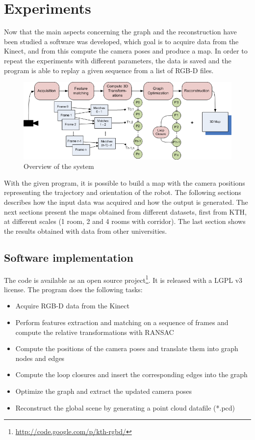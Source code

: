 \chapter{Experiments}
\label{chap:experiments}

Now that the main aspects concerning the graph and the reconstruction have been studied a software was developed, which goal is to acquire data from the Kinect, and from this compute the camera poses and produce a map. In order to repeat the experiments with different parameters, the data is saved and the program is able to replay a given sequence from a list of RGB-D files.

\begin{figure}[h!]
\begin{center}
\includegraphics[width=1.0\textwidth]{figures/overview}
\caption{Overview of the system}
\end{center}
\end{figure}

With the given program, it is possible to build a map with the camera positions representing the trajectory and orientation of the robot. The following sections describes how the input data was acquired and how the output is generated. The next sections present the maps obtained from different datasets, first from KTH, at different scales (1 room, 2 and 4 rooms with corridor). The last section shows the results obtained with data from other universities. 

\section{Software implementation}

The code is available as an open source project\footnote{\url{http://code.google.com/p/kth-rgbd/}}. It is released with a LGPL v3 license.
The program does the following tasks:
\begin{itemize}
\item Acquire RGB-D data from the Kinect
\item Perform features extraction and matching on a sequence of frames and compute the relative transformations with \gls{RANSAC}
\item Compute the positions of the camera poses and translate them into graph nodes and edges
\item Compute the loop closures and insert the corresponding edges into the graph
\item Optimize the graph and extract the updated camera poses
\item Reconstruct the global scene by generating a point cloud datafile (*.pcd)
\end{itemize}

